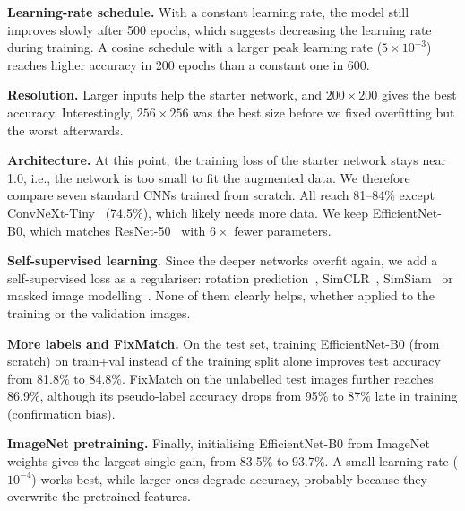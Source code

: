 \documentclass{article}
\begin{document}
\textbf{Learning-rate schedule.} With a constant learning rate, the model still improves slowly after 500 epochs, which suggests decreasing the learning rate during training. A cosine schedule with a larger peak learning rate ($5\times10^{-3}$) reaches higher accuracy in 200 epochs than a constant one in 600.

\textbf{Resolution.} Larger inputs help the starter network, and $200\times200$ gives the best accuracy. Interestingly, $256\times256$ was the best size before we fixed overfitting but the worst afterwards.

\textbf{Architecture.} At this point, the training loss of the starter network stays near 1.0, i.e., the network is too small to fit the augmented data. We therefore compare seven standard CNNs trained from scratch. All reach 81--84\% except ConvNeXt-Tiny~\cite{convnext} (74.5\%), which likely needs more data. We keep EfficientNet-B0, which matches ResNet-50~\cite{resnet} with $6\times$ fewer parameters.

\textbf{Self-supervised learning.} Since the deeper networks overfit again, we add a self-supervised loss as a regulariser: rotation prediction~\cite{rotnet}, SimCLR~\cite{simclr}, SimSiam~\cite{simsiam} or masked image modelling~\cite{mae}. None of them clearly helps, whether applied to the training or the validation images.

\textbf{More labels and FixMatch.} On the test set, training EfficientNet-B0 (from scratch) on train+val instead of the training split alone improves test accuracy from 81.8\% to 84.8\%. FixMatch on the unlabelled test images further reaches 86.9\%, although its pseudo-label accuracy drops from 95\% to 87\% late in training (confirmation bias).

\textbf{ImageNet pretraining.} Finally, initialising EfficientNet-B0 from ImageNet weights gives the largest single gain, from 83.5\% to 93.7\%. A small learning rate ($10^{-4}$) works best, while larger ones degrade accuracy, probably because they overwrite the pretrained features.
\end{document}

